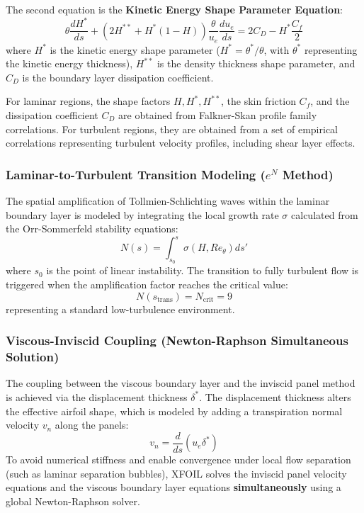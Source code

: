 \documentclass[11pt]{article}
\begin{document}
The second equation is the \textbf{Kinetic Energy Shape Parameter Equation}:
\begin{equation}
    \theta \frac{d H^*}{ds} + \left( 2 H^{**} + H^* (1 - H) \right) \frac{\theta}{u_e} \frac{du_e}{ds} = 2 C_D - H^* \frac{C_f}{2}
\end{equation}
where $H^*$ is the kinetic energy shape parameter ($H^* = \theta^* / \theta$, with $\theta^*$ representing the kinetic energy thickness), $H^{**}$ is the density thickness shape parameter, and $C_D$ is the boundary layer dissipation coefficient.

For laminar regions, the shape factors $H, H^*, H^{**}$, the skin friction $C_f$, and the dissipation coefficient $C_D$ are obtained from Falkner-Skan profile family correlations. For turbulent regions, they are obtained from a set of empirical correlations representing turbulent velocity profiles, including shear layer effects.

\subsubsection{Laminar-to-Turbulent Transition Modeling ($e^N$ Method)}
The spatial amplification of Tollmien-Schlichting waves within the laminar boundary layer is modeled by integrating the local growth rate $\sigma$ calculated from the Orr-Sommerfeld stability equations:
\begin{equation}
    N(s) = \int_{s_0}^s \sigma(H, Re_{\theta}) ds'
\end{equation}
where $s_0$ is the point of linear instability. The transition to fully turbulent flow is triggered when the amplification factor reaches the critical value:
\begin{equation}
    N(s_{\text{trans}}) = N_{\text{crit}} = 9
\end{equation}
representing a standard low-turbulence environment.

\subsubsection{Viscous-Inviscid Coupling (Newton-Raphson Simultaneous Solution)}
The coupling between the viscous boundary layer and the inviscid panel method is achieved via the displacement thickness $\delta^*$. The displacement thickness alters the effective airfoil shape, which is modeled by adding a transpiration normal velocity $v_n$ along the panels:
\begin{equation}
    v_n = \frac{d}{ds} \left( u_e \delta^* \right)
\end{equation}
To avoid numerical stiffness and enable convergence under local flow separation (such as laminar separation bubbles), XFOIL solves the inviscid panel velocity equations and the viscous boundary layer equations \textbf{simultaneously} using a global Newton-Raphson solver.
\end{document}

